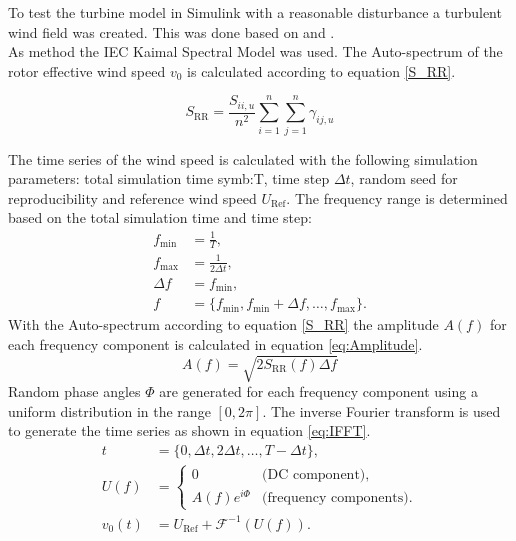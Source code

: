To test the turbine model in Simulink with a reasonable disturbance a turbulent wind field was created. This was done based on \cite{IEC61400-1} and \cite{SchlipfLecture}. \\
As method the IEC Kaimal Spectral Model \cite{IEC61400-1} was used. The Auto-spectrum of the rotor effective wind speed $v_0$ is calculated according to equation \ref{S_RR}.

\begin{equation}
	S_{\text{RR}} = \frac{S_{ii,u}}{n^2}\sum_{i=1}^{n}\sum_{j=1}^{n}\gamma_{ij,u}	
	\label{S_RR}
\end{equation}

The time series of the wind speed is calculated with the following simulation parameters: total simulation time \gls{symb:T}, time step $\Delta t$, random seed for reproducibility and reference wind speed $U_{\text{Ref}}$. The frequency range is determined based on the total simulation time and time step:
\begin{align*}
	f_{\min} &= \frac{1}{T}, \\
	f_{\max} &= \frac{1}{2\Delta t}, \\
	\Delta f &= f_{\min},\\
	f &= \{f_{\min}, f_{\min} + \Delta f, \ldots, f_{\max}\}.
\end{align*}
With the Auto-spectrum according to equation \ref{S_RR} the amplitude $A(f)$ for each frequency component is calculated in equation \ref{eq:Amplitude}.
\begin{equation}
	A(f) = \sqrt{2 S_{\text{RR}}(f) \Delta f}
	\label{eq:Amplitude}
\end{equation}
Random phase angles $\Phi$ are generated for each frequency component using a uniform distribution in the range $[0, 2\pi]$.
The inverse Fourier transform is used to generate the time series as shown in equation \ref{eq:IFFT}.
\begin{equation}
	\begin{aligned}
		t &= \{0, \Delta t, 2\Delta t, \ldots, T - \Delta t\}, \\
		U(f) &= 
		\begin{cases}
			0 & \text{(DC component)}, \\
			A(f) e^{i\Phi} & \text{(frequency components)}.
		\end{cases} \\
		v_0(t) &= U_{\text{Ref}} + \mathcal{F}^{-1}(U(f)).
	\end{aligned}
	\label{eq:IFFT}
\end{equation}

